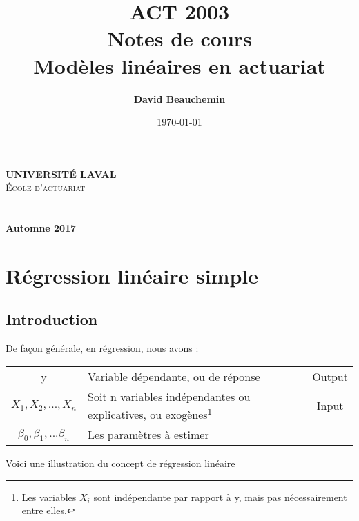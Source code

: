 \documentclass[11pt,french]{report}
\title{ACT 2003 \\ Notes de cours \\ Modèles linéaires en actuariat}
\author{\textbf{David Beauchemin}}
\date{\today}
\def\versionnumber{Automne 2017}
\begin{document}
\makeatletter
  \begin{titlepage}
  \centering
      {\large \textbf{\textsc{UNIVERSITÉ LAVAL}}}\\
      \textsc{École d'actuariat}\\
    \vspace{2cm}
    \vspace{2cm}
      {\LARGE \textbf{\@title}} \\
    \vfill
       {\large \@author} \\
    \vspace{8cm}
        {\large\textbf{\versionnumber}}\\
    \vfill
  \end{titlepage}
\makeatother


\pagebreak

\tableofcontents

\newpage





\chapter{Régression linéaire simple}

\section{Introduction}

De façon générale, en régression, nous avons :

\begin{tabularx}{\linewidth}{c|X|c}
\hline
y & Variable dépendante, ou de réponse & Output \\
$X_1, X_2, ..., X_n$ & Soit n variables indépendantes ou explicatives, ou exogènes\footnote{Les variables $X_i$ sont indépendante par rapport à y, mais pas nécessairement entre elles.} & Input \\
$\beta_0, \beta_1, ... \beta_n$ & Les paramètres à estimer & \\
\hline
\end{tabularx}

\bigskip
\bigskip
Voici une illustration du concept de régression linéaire
\end{document}

